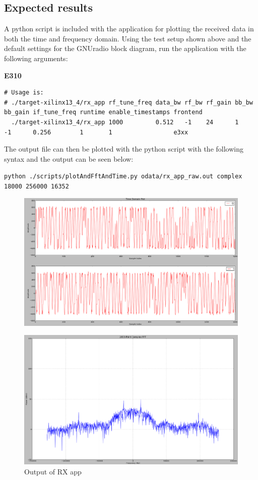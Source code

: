 \subsection{Expected results}
\noindent A python script is included with the application for plotting the received data in both the time and frequency domain. Using the test setup shown above and the default settings for the GNUradio block diagram, run the application with the following arguments:\par\medskip

\small

\noindent\textbf{E310}
\scriptsize
\noindent
\begin{verbatim}
# Usage is:
# ./target-xilinx13_4/rx_app rf_tune_freq data_bw rf_bw rf_gain bb_bw bb_gain if_tune_freq runtime enable_timestamps frontend
  ./target-xilinx13_4/rx_app 1000         0.512   -1    24      1     -1      0.256        1       1                 e3xx
\end{verbatim}
\small
\par\medskip
\noindent The output file can then be plotted with the python script with the following syntax and the output can be seen below:\par\medskip
\noindent\texttt{python ./scripts/plotAndFftAndTime.py odata/rx\_app\_raw.out complex 18000 256000 16352}\par
	\begin{figure}[h]
	 	\centering
		\includegraphics[scale=.2]{rx_app_iq_plot}
		\label{fig:rx_app_iq_plot}
	\end{figure}
	\begin{figure}[h]
	 	\centering
		\includegraphics[scale=.2]{rx_app_fft_plot}
		\caption{Output of RX app}
		\label{fig:rx_app_fft_plot}
	\end{figure}
